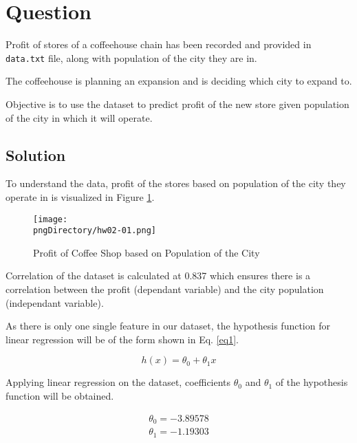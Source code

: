 \documentclass[12pt,letterpaper,twoside]{article}
\begin{document}

\makeHeader

\section*{Question}

Profit of stores of a coffeehouse chain has been recorded and provided in \texttt{data.txt} file, along with population of the city they are in.

The coffeehouse is planning an expansion and is deciding which city to expand to.

Objective is to use the dataset to predict profit of the new store given population of the city in which it will operate.

\subsection*{Solution}

To understand the data, profit of the stores based on population of the city they operate in is visualized in Figure \ref{fig1}.

\begin{figure}[H]\centering
\texttt{[image: \\pngDirectory/hw02-01.png]}
\caption{Profit of Coffee Shop based on Population of the City}\label{fig1}
\end{figure}

Correlation of the dataset is calculated at 0.837 which ensures there is a correlation between the profit (dependant variable) and the city population (independant variable).

As there is only one single feature in our dataset, the hypothesis function for linear regression will be of the form shown in Eq. \ref{eq1}.

\begin{equation}\label{eq1}
h(x) = \theta_0 + \theta_1 x
\end{equation}

Applying linear regression on the dataset, coefficients $\theta_0$ and $\theta_1$ of the hypothesis function will be obtained.

\begin{equation}\label{eq2}
\begin{split}
\theta_0 = -3.89578\\
\theta_1 = -1.19303
\end{split}
\end{equation}
\end{document}
